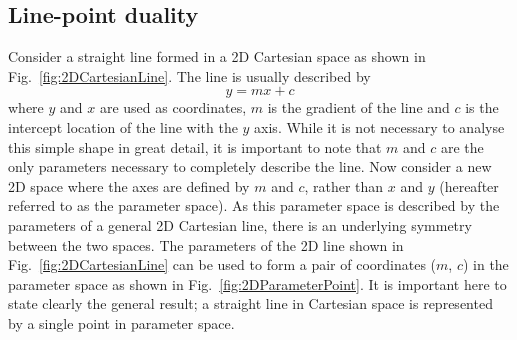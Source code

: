\subsection{Line-point duality}
\label{subsec:LinePointDuality}
Consider a straight line formed in a 2D Cartesian space as shown in Fig.~\ref{fig:2DCartesianLine}.  The line is usually described by
\begin{equation}
  y = mx + c
  \label{eq:2DLineCartesean}
\end{equation}
where $y$ and $x$ are used as coordinates, $m$ is the gradient of the line and $c$ is the intercept location of the line with the $y$ axis.  While it is not necessary to analyse this simple shape in great detail, it is important to note that $m$ and $c$ are the only parameters necessary to completely describe the line.  
\newline
\newline
Now consider a new 2D space where the axes are defined by $m$ and $c$, rather than $x$ and $y$ (hereafter referred to as the parameter space).  As this parameter space is described by the parameters of a general 2D Cartesian line, there is an underlying symmetry between the two spaces.  The parameters of the 2D line shown in Fig.~\ref{fig:2DCartesianLine} can be used to form a pair of coordinates ($m$, $c$) in the parameter space as shown in Fig.~\ref{fig:2DParameterPoint}.  It is important here to state clearly the general result; a straight line in Cartesian space is represented by a single point in parameter space. 

